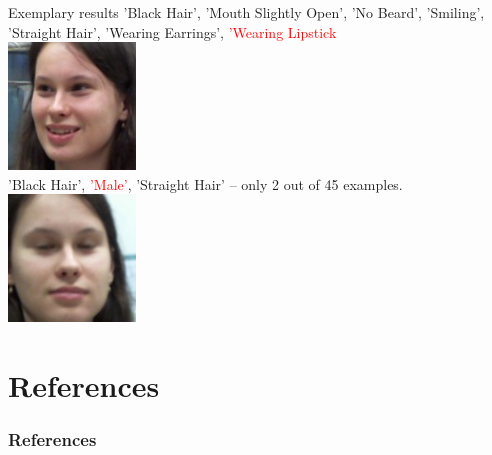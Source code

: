 \documentclass{beamer}
\begin{document}
\begin{frame}{Exemplary results}
'Black Hair', 'Mouth Slightly Open', 'No Beard', 'Smiling', 'Straight Hair', 'Wearing Earrings', \textcolor{red}{'Wearing Lipstick}
 \\
 \centering
\includegraphics[height=0.3\textheight]{figures/leti_normalised24}\\
'Black Hair', \textcolor{red}{'Male'}, 'Straight Hair' -- only 2 out of 45 examples. \\
\includegraphics[height=0.3\textheight]{figures/leti_normalised0}
\end{frame}



\section{References}
\begin{frame}
	\frametitle{References}
	\footnotesize
	
\end{frame}
\end{document}
